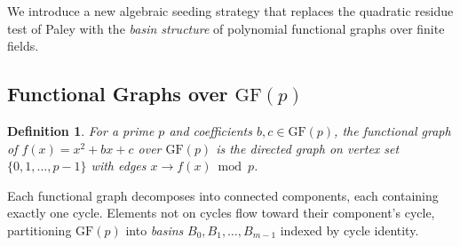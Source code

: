 \documentclass[11pt,a4paper]{article}
\theoremstyle{plain}
\newtheorem{definition}[theorem]{Definition}
\theoremstyle{remark}
\newcommand{\GF}{\mathrm{GF}}
\begin{document}
We introduce a new algebraic seeding strategy that replaces the
quadratic residue test of Paley with the \emph{basin structure} of
polynomial functional graphs over finite fields.

\subsection{Functional Graphs over $\GF(p)$}

\begin{definition}
For a prime $p$ and coefficients $b, c \in \GF(p)$, the
\emph{functional graph} of $f(x) = x^2 + bx + c$ over $\GF(p)$
is the directed graph on vertex set $\{0, 1, \ldots, p-1\}$
with edges $x \to f(x) \bmod p$.
\end{definition}

Each functional graph decomposes into connected components, each
containing exactly one cycle. Elements not on cycles flow toward
their component's cycle, partitioning $\GF(p)$ into \emph{basins}
$B_0, B_1, \ldots, B_{m-1}$ indexed by cycle identity.
\end{document}
